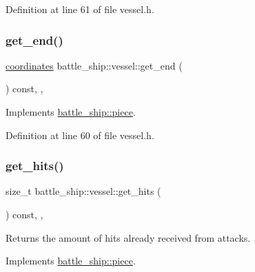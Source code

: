 Definition at line 61 of file vessel.\+h.

\mbox{\label{classbattle__ship_1_1vessel_ab24ee1fe21632b510833c8369ef3560a}} 
\subsubsection{\texorpdfstring{get\+\_\+end()}{get\_end()}}
{\footnotesize\ttfamily \hyperlink{structbattle__ship_1_1coordinates}{coordinates} battle\+\_\+ship\+::vessel\+::get\+\_\+end (\begin{DoxyParamCaption}{ }\end{DoxyParamCaption}) const\hspace{0.3cm}{\ttfamily [inline]}, {\ttfamily [override]}, {\ttfamily [virtual]}}



Implements \hyperlink{classbattle__ship_1_1piece_a4f7ac17a3ba66f104d2c5110e0fe51d4}{battle\+\_\+ship\+::piece}.



Definition at line 60 of file vessel.\+h.

\mbox{\label{classbattle__ship_1_1vessel_a549dc0f3fc45f3b3f7fa247316900a9a}} 
\subsubsection{\texorpdfstring{get\+\_\+hits()}{get\_hits()}}
{\footnotesize\ttfamily size\+\_\+t battle\+\_\+ship\+::vessel\+::get\+\_\+hits (\begin{DoxyParamCaption}{ }\end{DoxyParamCaption}) const\hspace{0.3cm}{\ttfamily [inline]}, {\ttfamily [override]}, {\ttfamily [virtual]}}



Returns the amount of hits already received from attacks. 



Implements \hyperlink{classbattle__ship_1_1piece_a51123474a964caa97a4c29b053ac0fad}{battle\+\_\+ship\+::piece}.



